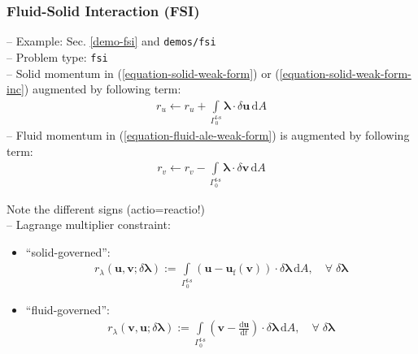\documentclass[a4paper,12pt]{report}
\newcommand{\fS}{\text{s}}
\newcommand{\fF}{\text{f}}
\newcommand{\Gm}{\mathit{\Gamma}}
\begin{document}
\subsubsection{Fluid-Solid Interaction (FSI)}\label{fluid-solid-interaction-fsi}

-- Example: Sec. \ref{demo-fsi} and \verb"demos/fsi"\\

-- Problem type: \verb"fsi"\\

-- Solid momentum in (\ref{equation-solid-weak-form}) or (\ref{equation-solid-weak-form-inc}) augmented by following term:
\begin{equation}
\begin{aligned}
r_u \leftarrow r_u + \int\limits_{\Gm_0^{\fF\text{-}\fS}}\boldsymbol{\lambda}\cdot\delta\boldsymbol{u}\,\mathrm{d}A
\end{aligned}
\end{equation}
-- Fluid momentum in (\ref{equation-fluid-ale-weak-form}) is augmented by following term:
\begin{equation}
\begin{aligned}
r_v \leftarrow r_v - \int\limits_{\Gm_0^{\fF\text{-}\fS}}\boldsymbol{\lambda}\cdot\delta\boldsymbol{v}\,\mathrm{d}A
\end{aligned}
\end{equation}

Note the different signs (actio=reactio!)\\

-- Lagrange multiplier constraint:

\begin{itemize}

\item ``solid-governed'':
\begin{equation}
\begin{aligned}
r_{\lambda}(\boldsymbol{u},\boldsymbol{v};\delta\boldsymbol{\lambda}):= \int\limits_{\Gm_0^{\mathrm{\fF\text{-}\fS}}} \left(\boldsymbol{u} - \boldsymbol{u}_{\mathrm{f}}(\boldsymbol{v})\right)\cdot\delta\boldsymbol{\lambda}\,\mathrm{d}A, \quad \forall \; \delta\boldsymbol{\lambda}
\end{aligned}
\end{equation}

\item ``fluid-governed'':
\begin{equation}
\begin{aligned}
r_{\lambda}(\boldsymbol{v},\boldsymbol{u};\delta\boldsymbol{\lambda}):= \int\limits_{\Gm_0^{\mathrm{\fF\text{-}\fS}}} \left(\boldsymbol{v} - \frac{\mathrm{d} \boldsymbol{u}}{\mathrm{d} t}\right)\cdot\delta\boldsymbol{\lambda}\,\mathrm{d}A, \quad \forall \; \delta\boldsymbol{\lambda}
\end{aligned}
\end{equation}

\end{itemize}
\end{document}
